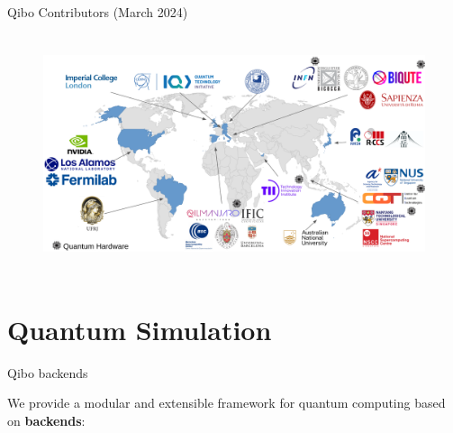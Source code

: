 \documentclass[aspectratio=169, 8pt, xcolor={svgnames}, hyperref={linkcolor=black}]{beamer}
\begin{document}
 \begin{frame}{Qibo Contributors (March 2024)}
   \begin{figure}
       \includegraphics[height=7cm]{figures/qibocoll.png}
   \end{figure}
 \end{frame}

\section{Quantum Simulation}

\begin{frame}{Qibo backends}

  We provide a modular and extensible framework for quantum computing based on \textbf{backends}:
  \vspace{-0.5cm}
  \begin{figure}
  \end{figure}

\end{frame}
\end{document}
